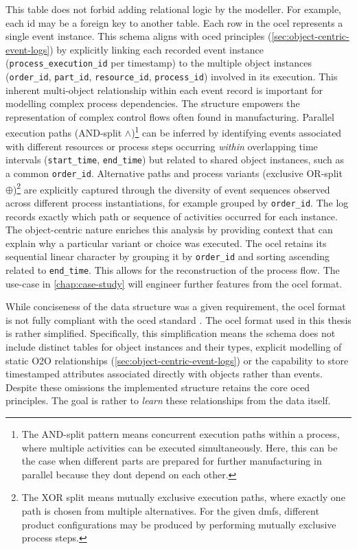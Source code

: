 This table does not forbid adding relational logic by the modeller. For example, each \gls{id} may be a foreign key to another table. Each row in the \gls{ocel} represents a single event instance. This schema aligns with \gls{oced} principles (\autoref{sec:object-centric-event-logs}) by explicitly linking each recorded event instance (\texttt{process\_execution\_id} per timestamp) to the multiple object instances (\texttt{order\_id}, \texttt{part\_id}, \texttt{resource\_id}, \texttt{process\_id}) involved in its execution. This inherent multi-object relationship within each event record is important for modelling complex process dependencies. The structure empowers the representation of complex control flows often found in manufacturing. Parallel execution paths (AND-split $\wedge$)\footnote{The AND-split pattern means concurrent execution paths within a process, where multiple activities can be executed simultaneously. Here, this can be the case when different parts are prepared for further manufacturing in parallel because they dont depend on each other.} can be inferred by identifying events associated with different resources or process steps occurring \textit{within} overlapping time intervals (\texttt{start\_time}, \texttt{end\_time}) but related to shared object instances, such as a common \texttt{order\_id}. Alternative paths and process variants (exclusive OR-split $\oplus$)\footnote{The XOR split means mutually exclusive execution paths, where exactly one path is chosen from multiple alternatives. For the given \gls{dmfs}, different product configurations may be produced by performing mutually exclusive process steps.} are explicitly captured through the diversity of event sequences observed across different process instantiations, for example grouped by \texttt{order\_id}. The log records exactly which path or sequence of activities occurred for each instance. The object-centric nature enriches this analysis by providing context that can explain why a particular variant or choice was executed. The \gls{ocel} retains its sequential linear character by grouping it by \texttt{order\_id} and sorting ascending related to \texttt{end\_time}. This allows for the reconstruction of the process flow. The use-case in \autoref{chap:case-study} will engineer further features from the \gls{ocel} format.

While conciseness of the data structure was a given requirement, the \gls{ocel} format is not fully compliant with the \gls{oced} standard \autocite{van2023object}. The \gls{ocel} format used in this thesis is rather simplified. Specifically, this simplification means the schema does not include distinct tables for object instances and their types, explicit modelling of static O2O relationships (\autoref{sec:object-centric-event-logs}) or the capability to store timestamped attributes associated directly with objects rather than events. Despite these omissions the implemented structure retains the core \gls{oced} principles. The goal is rather to \textit{learn} these relationships from the data itself.

